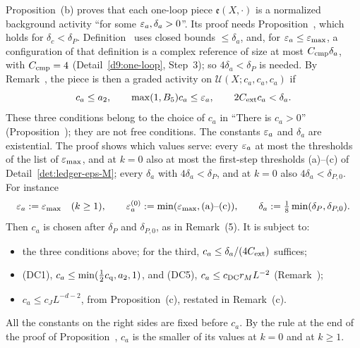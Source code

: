 \begin{detail}
\begin{step}
Proposition~(b) proves that each one-loop piece $\mathfrak e(X,\cdot)$ is a normalized background activity ``for some $\varepsilon_a,\delta_a>0$''. Its proof needs Proposition~, which holds for $\delta_c<\delta_P$. Definition~ uses closed bounds $\le\delta_a$, and, for $\varepsilon_a\le\varepsilon_{\max}$, a configuration of that definition is a complex reference of size at most $C_{\rm cmp}\delta_a$, with $C_{\rm cmp}=4$ (Detail~\ref{d9:one-loop}, Step~3); so $4\delta_a<\delta_P$ is needed. By Remark~, the piece is then a graded activity on $\mathcal U(X;c_a,c_a,c_a)$ if
\[
c_a\le a_2,\qquad\max(1,B_5)c_a\le\varepsilon_a,\qquad 2C_{\rm ext}c_a<\delta_a .
\]
These three conditions belong to the choice of $c_a$ in ``There is $c_a>0$'' (Proposition~); they are not free conditions. The constants $\varepsilon_a$ and $\delta_a$ are existential. The proof shows which values serve: every $\varepsilon_a$ at most the thresholds of the list of $\varepsilon_{\max}$, and at $k=0$ also at most the first-step thresholds (a)--(c) of Detail~\ref{det:ledger-eps-M}; every $\delta_a$ with $4\delta_a<\delta_P$, and at $k=0$ also $4\delta_a<\delta_{P,0}$. For instance
\[
\varepsilon_a:=\varepsilon_{\max}\quad(k\ge1),\qquad\varepsilon^{(0)}_a:=\min(\varepsilon_{\max},\text{(a)--(c)}),\qquad\delta_a:=\tfrac18\min(\delta_P,\delta_{P,0}).
\]
Then $c_a$ is chosen after $\delta_P$ and $\delta_{P,0}$, as in Remark~(5). It is subject to:
\begin{itemize}
\item the three conditions above; for the third, $c_a\le\delta_a/(4C_{\rm ext})$ suffices;
\item (DC1), $c_a\le\min(\frac12c_{\rm q},a_2,1)$, and (DC5), $c_a\le c_{\rm DC}r_ML^{-2}$ (Remark~);
\item $c_a\le c_JL^{-d-2}$, from Proposition~(c), restated in Remark~(c).
\end{itemize}
All the constants on the right sides are fixed before $c_a$. By the rule at the end of the proof of Proposition~, $c_a$ is the smaller of its values at $k=0$ and at $k\ge1$.
\end{step}
\end{detail}

